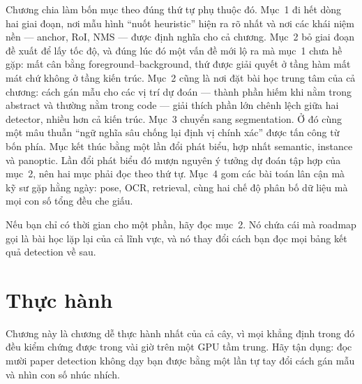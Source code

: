 \documentclass[../../deep_learning.tex]{subfiles}
\begin{document}
Chương chia làm bốn mục theo đúng thứ tự phụ thuộc đó. Mục~1 đi hết dòng hai giai đoạn, nơi mẫu hình ``nuốt heuristic'' hiện ra rõ nhất và nơi các khái niệm nền --- anchor, RoI, NMS --- được định nghĩa cho cả chương. Mục~2 bỏ giai đoạn đề xuất để lấy tốc độ, và đúng lúc đó một vấn đề mới lộ ra mà mục~1 chưa hề gặp: mất cân bằng foreground--background, thứ được giải quyết ở tầng hàm mất mát chứ không ở tầng kiến trúc. Mục~2 cũng là nơi đặt bài học trung tâm của cả chương: cách gán mẫu cho các vị trí dự đoán --- thành phần hiếm khi nằm trong abstract và thường nằm trong code --- giải thích phần lớn chênh lệch giữa hai detector, nhiều hơn cả kiến trúc. Mục~3 chuyển sang segmentation. Ở đó cùng một mâu thuẫn ``ngữ nghĩa sâu chống lại định vị chính xác'' được tấn công từ bốn phía. Mục kết thúc bằng một lần đổi phát biểu, hợp nhất semantic, instance và panoptic. Lần đổi phát biểu đó mượn nguyên ý tưởng dự đoán tập hợp của mục~2, nên hai mục phải đọc theo thứ tự. Mục~4 gom các bài toán lân cận mà kỹ sư gặp hằng ngày: pose, OCR, retrieval, cùng hai chế độ phân bố dữ liệu mà mọi con số tổng đều che giấu.

Nếu bạn chỉ có thời gian cho một phần, hãy đọc mục~2. Nó chứa cái mà roadmap gọi là bài học lặp lại của cả lĩnh vực, và nó thay đổi cách bạn đọc mọi bảng kết quả detection về sau.







\section{Thực hành}
Chương này là chương dễ thực hành nhất của cả cây, vì mọi khẳng định trong đó đều kiểm chứng được trong vài giờ trên một GPU tầm trung. Hãy tận dụng: đọc mười paper detection không dạy bạn được bằng một lần tự tay đổi cách gán mẫu và nhìn con số nhúc nhích.
\end{document}
